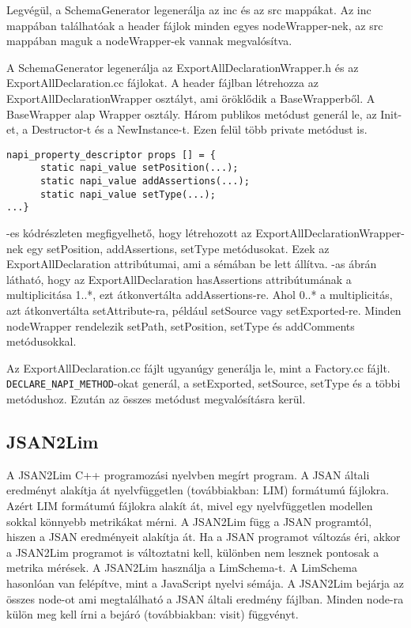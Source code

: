 Legvégül, a SchemaGenerator legenerálja az inc és az src mappákat.
Az inc mappában találhatóak a header fájlok minden egyes nodeWrapper-nek, az src mappában maguk a nodeWrapper-ek vannak megvalósítva.


A SchemaGenerator legenerálja az ExportAllDeclarationWrapper.h és az ExportAllDeclaration.cc fájlokat.
A header fájlban létrehozza az ExportAllDeclarationWrapper osztályt, ami öröklődik a BaseWrapperből. A BaseWrapper alap Wrapper osztály.
Három publikos metódust generál le, az Init-et, a Destructor-t és a NewInstance-t.
Ezen felül több private metódust is.

\begin{lstlisting}[caption={ExportAllDeclarationWrapper.h fájl}, label={lst:ExportAllDeclarationWrapper_header}, language={CStyle}]
napi_property_descriptor props [] = {
      static napi_value setPosition(...);
      static napi_value addAssertions(...);
      static napi_value setType(...);
...}
\end{lstlisting}

-es kódrészleten megfigyelhető, hogy létrehozott az ExportAllDeclarationWrapper-nek egy setPosition, addAssertions, setType metódusokat.
Ezek az ExportAllDeclaration attribútumai, ami a sémában be lett állítva.
-as ábrán látható, hogy az ExportAllDeclaration hasAssertions attribútumának a multiplicitása 1..*, ezt átkonvertálta addAssertions-re.
Ahol 0..* a multiplicitás, azt átkonvertálta setAttribute-ra, például setSource vagy setExported-re.
Minden nodeWrapper rendelezik setPath, setPosition, setType és addComments metódusokkal.


Az ExportAllDeclaration.cc fájlt ugyanúgy generálja le, mint a Factory.cc fájlt. \texttt{DECLARE\_NAPI\_METHOD}-okat generál, a setExported, setSource, setType és a többi metódushoz.
Ezután az összes metódust megvalósításra kerül.

\subsection{JSAN2Lim}
A JSAN2Lim C++ programozási nyelvben megírt program. A JSAN általi eredményt alakítja át nyelvfüggetlen (továbbiakban: LIM) formátumú fájlokra.
Azért LIM formátumú fájlokra alakít át, mivel egy nyelvfüggetlen modellen sokkal könnyebb metrikákat mérni.
A JSAN2Lim függ a JSAN programtól, hiszen a JSAN eredményeit alakítja át.
Ha a JSAN programot változás éri, akkor a JSAN2Lim programot is változtatni kell, különben nem lesznek pontosak a metrika mérések.
A JSAN2Lim használja a LimSchema-t. A LimSchema hasonlóan van felépítve, mint a JavaScript nyelvi sémája.
A JSAN2Lim bejárja az összes node-ot ami megtalálható a JSAN általi eredmény fájlban.
Minden node-ra külön meg kell írni a bejáró (továbbiakban: visit) függvényt.


